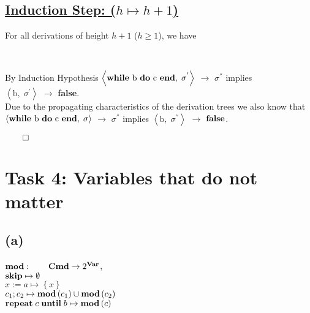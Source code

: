 \documentclass[12pt]{scrartcl}
\newcommand{\eState}[2]{$\left\langle \text{#1},\; \text{#2}\right\rangle$}
\newcommand{\eRule}[3]{\eState{#1}{#2} $\rightarrow$ #3}
\begin{document}
		\subsection*{\underline{Induction Step: ({\boldmath$h\mapsto h+1$})}}
		\indent\indent For all derivations of height $h+1$ ($h\geq 1$), we have\\
		\begin{center}		
		\begin{prooftree}
		\end{prooftree}\\
		\end{center}
		\indent\indent By Induction Hypothesis \eRule{\textbf{while} b \textbf{do} c \textbf{end}}{$\sigma ^{'}$}{$\sigma ^{''}$} implies\\\indent \eRule{b}{$\sigma ^{'}$}{\textbf{false}}.\\
		\indent Due to the propagating characteristics of the derivation trees we also know \indent that \eRule{\textbf{while} b \textbf{do} c \textbf{end}}{$\sigma$}{$\sigma ^{''}$} implies \eRule{b}{$\sigma ^{''}$}{$\text{\textbf{false}}$}. 
		\begin{flushright}
			$\qed$
		\end{flushright}
	\section*{Task 4: Variables that do not matter}
	
	\subsection*{(a)}
	
	\indent\indent $\text{\textbf{mod}}: \qquad \text{\textbf{Cmd}}\rightarrow 2^{\text{\textbf{Var}}}$,\\
	\indent $\text{\textbf{skip}}\mapsto\emptyset$\\
	\indent $x:=a\mapsto \left\lbrace x \right\rbrace$\\
	\indent $c_1;c_2\mapsto \text{\textbf{mod}}\left( c_1\right) \cup\text{\textbf{mod}}\left( c_2\right)$\\
	\indent $\text{\textbf{repeat}}\; c\; \text{\textbf{until}}\; b \mapsto \text{\textbf{mod}}\left( c\right)$\\
	
\end{document}
